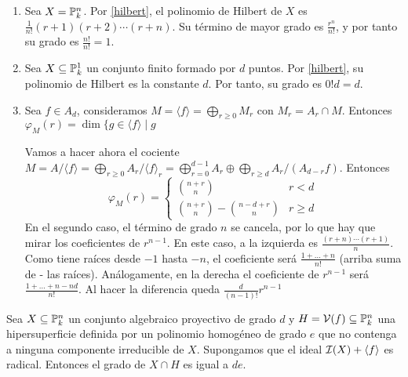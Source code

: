 \documentclass[ACGA.tex]{subfiles}
\begin{document}
\begin{ejs}

\begin{enumerate}
        \item Sea $X=\mathbb{P}^n_k$. Por \ref{hilbert}, el polinomio de Hilbert de $X$ es $\frac{1}{n!}(r+1)(r+2)\cdots(r+n)$. Su término de mayor grado es $\frac{r^n}{n!}$, y por tanto su grado es $\frac{n!}{n!}=1$.
\item Sea $X\subseteq\mathbb{P}^1_k$ un conjunto finito formado por $d$ puntos. Por \ref{hilbert}, su polinomio de Hilbert es la constante $d$. Por tanto, su grado es $0!d=d$.

	\item Sea $f\in A_d$, consideramos $M=\langle f\rangle=\bigoplus_{r\geq 0}M_r$ con $M_r=A_r\cap M$. Entonces $\varphi_M(r)=\dim\{g\in\langle f\rangle\mid g$ %

Vamos a hacer ahora el cociente $M=A/\langle f\rangle=\bigoplus_{r\geq 0} A_r/\langle f\rangle_r=\bigoplus_{r=0}^{d-1}A_r\oplus\bigoplus_{r\geq d}A_r/(A_{d-r}f)$.
Entonces 
\[
\varphi_M(r)=\begin{cases}
\binom{n+r}{n} & r<d\\
\binom{n+r}{n}-\binom{n-d+r}{n} & r\geq d
\end{cases}
\] 
En el segundo caso, el término de grado $n$ se cancela, por lo que hay que mirar los coeficientes de $r^{n-1}$. En este caso, a la izquierda es $\frac{(r+n)\cdots (r+1)}{n}$. Como tiene raíces desde $-1$ hasta $-n$, el coeficiente será $\frac{1+\dots+n}{n!}$ (arriba suma de - las raíces). Análogamente, en la derecha el coeficiente de $r^{n-1}$ será $\frac{1+\dots+n-nd}{n!}$. Al hacer la diferencia queda $\frac{d}{(n-1)!}r^{n-1}$
\end{enumerate}

\end{ejs}

\begin{prop}\label{gradointerseccion}
 Sea $X\subseteq\mathbb{P}^n_k$ un conjunto algebraico proyectivo de grado $d$ y $H=\mathcal{V}(f)\subseteq\mathbb{P}^n_k$ una hipersuperficie definida por un polinomio homogéneo de grado $e$ que no contenga a ninguna componente irreducible de $X$. Supongamos que el ideal $\mathcal{I}(X)+\langle f\rangle$ es radical. Entonces el grado de $X\cap H$ es igual a $de$.
\end{prop}
\end{document}

